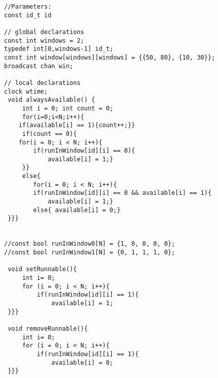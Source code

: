 \begin{figure}[H]
	\begin{lstlisting}[language=my_c, caption={Declarations and function}, label=lst:insolation_code]
//Parameters:
const id_t id

// global declarations
const int windows = 2;
typedef int[0,windows-1] id_t;
const int window[windows][windows] = {{50, 80}, {10, 30}};
broadcast chan win;

// local declarations
clock wtime; 
 void alwaysAvailable() { 
     int i = 0; int count = 0;
     for(i=0;i<N;i++){
	if(available[i] == 1){count++;}}
     if(count == 0){
	for(i = 0; i < N; i++){
     	if(runInWindow[id][i] == 0){ 
        	available[i] = 1;}
     }}
     else{
     	for(i = 0; i < N; i++){
     	if(runInWindow[id][i] == 0 && available[i] == 1){ 
        	available[i] = 1;}
     	else{ available[i] = 0;}
 }}}
 

//const bool runInWindow0[N] = {1, 0, 0, 0, 0}; 
//const bool runInWindow1[N] = {0, 1, 1, 1, 0};

 void setRunnable(){ 
     int i= 0; 
     for (i = 0; i < N; i++){
         if(runInWindow[id][i] == 1){ 
             available[i] = 1; 
 }}} 
 
 void removeRunnable(){
     int i= 0; 
     for (i = 0; i < N; i++){ 
         if(runInWindow[id][i] == 1){ 
             available[i] = 0; 
 }}}
	\end{lstlisting}
\end{figure}
